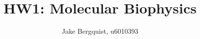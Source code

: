 \documentclass[12pt]{article}
\begin{document}
\title{HW1: Molecular Biophysics}
\author{Jake Bergquist, u6010393 }
\maketitle
\end{document}
